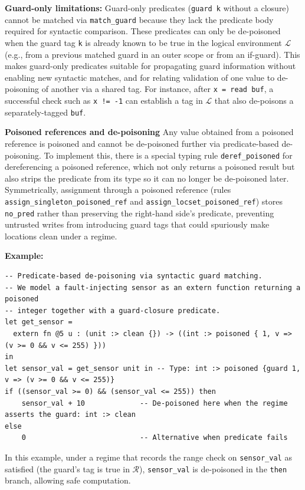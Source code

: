\documentclass[12pt]{article}
\begin{document}
\textbf{Guard-only limitations:} Guard-only predicates (\texttt{guard k} without
a closure) cannot be matched via \texttt{match\_guard} because they lack the
predicate body required for syntactic comparison. These predicates can only be
de-poisoned when the guard tag \texttt{k} is already known to be true in the
logical environment $\mathcal{L}$ (e.g., from a previous matched guard in an
outer scope or from an if-guard). This makes guard-only predicates
suitable for propagating guard information without enabling new syntactic
matches, and for relating validation of one value to de-poisoning of another via
a shared tag. For instance, after \texttt{x = read buf}, a successful check such as
\texttt{x != -1} can establish a tag in $\mathcal{L}$ that also de-poisons a
separately-tagged \texttt{buf}.

\textbf{Poisoned references and de-poisoning} Any value obtained from a poisoned
reference is poisoned and cannot be de-poisoned further via predicate-based
de-poisoning. To implement this, there is a special typing rule
\texttt{deref\_poisoned} for dereferencing a poisoned reference, which not only
returns a poisoned result but also strips the predicate from its type so it can
no longer be de-poisoned later. Symmetrically, assignment through a poisoned
reference (rules \texttt{assign\_singleton\_poisoned\_ref} and
\texttt{assign\_locset\_poisoned\_ref}) stores \texttt{no\_pred} rather than
preserving the right-hand side's predicate, preventing untrusted writes from
introducing guard tags that could spuriously make locations clean under a regime.

\textbf{Example:}

\begin{lstlisting}[language=poison]
-- Predicate-based de-poisoning via syntactic guard matching.
-- We model a fault-injecting sensor as an extern function returning a poisoned
-- integer together with a guard-closure predicate.
let get_sensor =
  extern fn @5 u : (unit :> clean {}) -> ((int :> poisoned { 1, v => (v >= 0 && v <= 255) }))
in
let sensor_val = get_sensor unit in -- Type: int :> poisoned {guard 1, v => (v >= 0 && v <= 255)}
if ((sensor_val >= 0) && (sensor_val <= 255)) then
    sensor_val + 10             -- De-poisoned here when the regime asserts the guard: int :> clean
else
    0                           -- Alternative when predicate fails
\end{lstlisting}

In this example, under a regime that records the range check on \texttt{sensor\_val} as satisfied (the guard's tag is true in $\mathcal{R}$), \texttt{sensor\_val} is de-poisoned in the \texttt{then} branch, allowing safe computation.
\end{document}
